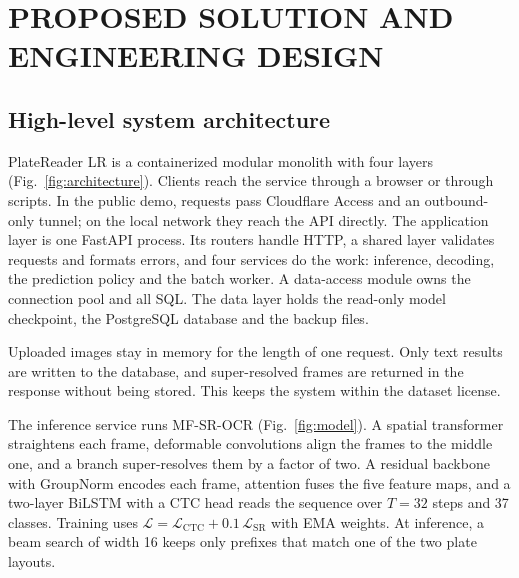 \section{PROPOSED SOLUTION AND ENGINEERING DESIGN}

\subsection{High-level system architecture}

PlateReader LR is a containerized modular monolith with four layers (Fig.~\ref{fig:architecture}).
Clients reach the service through a browser or through scripts. In the public demo, requests pass
Cloudflare Access and an outbound-only tunnel; on the local network they reach the API directly.
The application layer is one FastAPI process. Its routers handle HTTP, a shared layer validates
requests and formats errors, and four services do the work: inference, decoding, the prediction
policy and the batch worker. A data-access module owns the connection pool and all SQL. The data
layer holds the read-only model checkpoint, the PostgreSQL database and the backup files.

Uploaded images stay in memory for the length of one request. Only text results are written to the
database, and super-resolved frames are returned in the response without being stored. This keeps the
system within the dataset license.


The inference service runs MF-SR-OCR (Fig.~\ref{fig:model}). A spatial transformer straightens each
frame, deformable convolutions align the frames to the middle one, and a branch super-resolves them
by a factor of two. A residual backbone with GroupNorm encodes each frame, attention fuses the five
feature maps, and a two-layer BiLSTM with a CTC head \cite{graves2006ctc} reads the sequence over
$T=32$ steps and 37 classes. Training uses
$\mathcal{L}=\mathcal{L}_{\mathrm{CTC}}+0.1\,\mathcal{L}_{\mathrm{SR}}$ with EMA weights. At
inference, a beam search of width 16 keeps only prefixes that match one of the two plate layouts.


